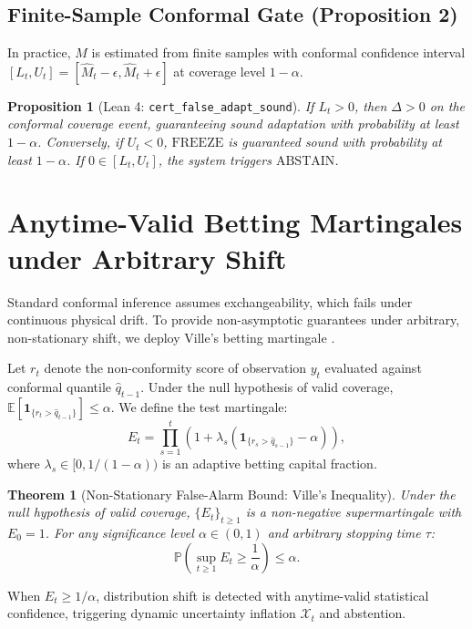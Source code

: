 \documentclass[10pt]{article}
\newtheorem{theorem}{Theorem}
\newtheorem{proposition}{Proposition}
\begin{document}
\subsection{Finite-Sample Conformal Gate (Proposition 2)}
In practice, $M$ is estimated from finite samples with conformal confidence interval $[L_t, U_t] = [\hat{M}_t - \epsilon, \hat{M}_t + \epsilon]$ at coverage level $1 - \alpha$. 
\begin{proposition}[Lean 4: \texttt{cert\_false\_adapt\_sound}]
If $L_t > 0$, then $\Delta > 0$ on the conformal coverage event, guaranteeing sound adaptation with probability at least $1 - \alpha$. Conversely, if $U_t < 0$, $\mathrm{FREEZE}$ is guaranteed sound with probability at least $1 - \alpha$. If $0 \in [L_t, U_t]$, the system triggers $\mathrm{ABSTAIN}$.
\end{proposition}

\section{Anytime-Valid Betting Martingales under Arbitrary Shift}
Standard conformal inference assumes exchangeability, which fails under continuous physical drift. To provide non-asymptotic guarantees under arbitrary, non-stationary shift, we deploy Ville's betting martingale \cite{ville_1939}.

Let $r_t$ denote the non-conformity score of observation $y_t$ evaluated against conformal quantile $\hat{q}_{t-1}$. Under the null hypothesis of valid coverage, $\mathbb{E}[\mathbf{1}_{\{r_t > \hat{q}_{t-1}\}}] \le \alpha$. We define the test martingale:
\begin{equation}
E_t = \prod_{s=1}^t \left( 1 + \lambda_s \left( \mathbf{1}_{\{r_s > \hat{q}_{s-1}\}} - \alpha \right) \right),
\end{equation}
where $\lambda_s \in [0, 1/(1-\alpha))$ is an adaptive betting capital fraction.

\begin{theorem}[Non-Stationary False-Alarm Bound: Ville's Inequality]
Under the null hypothesis of valid coverage, $\{E_t\}_{t \ge 1}$ is a non-negative supermartingale with $E_0 = 1$. For any significance level $\alpha \in (0, 1)$ and arbitrary stopping time $\tau$:
\begin{equation}
\mathbb{P}\left( \sup_{t \ge 1} E_t \ge \frac{1}{\alpha} \right) \le \alpha.
\end{equation}
\end{theorem}

When $E_t \ge 1/\alpha$, distribution shift is detected with anytime-valid statistical confidence, triggering dynamic uncertainty inflation $\mathcal{X}_t$ and abstention.
\end{document}

